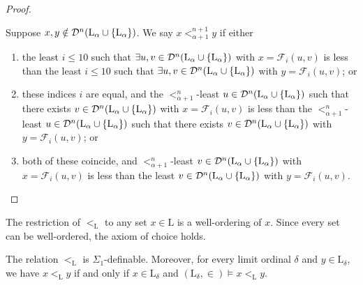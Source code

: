 \begin{proof}
\begin{enumerate}
        Suppose \( x, y \notin \mathcal D^n(\mathrm{L}_\alpha \cup \qty{\mathrm{L}_\alpha}) \).
        We say \( x <_{\alpha + 1}^{n+1} y \) if either
        \begin{enumerate}
            \item the least \( i \leq 10 \) such that \( \exists u, v \in \mathcal D^n(\mathrm{L}_\alpha \cup \qty{\mathrm{L}_\alpha}) \) with \( x = \mathcal F_i(u, v) \) is less than the least \( i \leq 10 \) such that \( \exists u, v \in \mathcal D^n(\mathrm{L}_\alpha \cup \qty{\mathrm{L}_\alpha}) \) with \( y = \mathcal F_i(u, v) \); or
            \item these indices \( i \) are equal, and the \( <_{\alpha + 1}^n \)-least \( u \in \mathcal D^n(\mathrm{L}_\alpha \cup \qty{\mathrm{L}_\alpha}) \) such that there exists \( v \in \mathcal D^n(\mathrm{L}_\alpha \cup \qty{\mathrm{L}_\alpha}) \) with \( x = \mathcal F_i(u, v) \) is less than the \( <_{\alpha + 1}^n \)-least \( u \in \mathcal D^n(\mathrm{L}_\alpha \cup \qty{\mathrm{L}_\alpha}) \) such that there exists \( v \in \mathcal D^n(\mathrm{L}_\alpha \cup \qty{\mathrm{L}_\alpha}) \) with \( y = \mathcal F_i(u, v) \); or
            \item both of these coincide, and \( <_{\alpha + 1}^n \)-least \( v \in \mathcal D^n(\mathrm{L}_\alpha \cup \qty{\mathrm{L}_\alpha}) \) with \( x = \mathcal F_i(u, v) \) is less than the least \( v \in \mathcal D^n(\mathrm{L}_\alpha \cup \qty{\mathrm{L}_\alpha}) \) with \( y = \mathcal F_i(u, v) \).
        \end{enumerate}
    \end{enumerate}
\end{proof}
The restriction of \( <_{\mathrm{L}} \) to any set \( x \in \mathrm{L} \) is a well-ordering of \( x \).
Since every set can be well-ordered, the axiom of choice holds.
\begin{lemma}
    The relation \( <_{\mathrm{L}} \) is \( \Sigma_1 \)-definable.
    Moreover, for every limit ordinal \( \delta \) and \( y \in \mathrm{L}_\delta \), we have \( x <_{\mathrm{L}} y \) if and only if \( x \in \mathrm{L}_\delta \) and \( (\mathrm{L}_\delta, \in) \vDash x <_{\mathrm{L}} y \).
\end{lemma}

